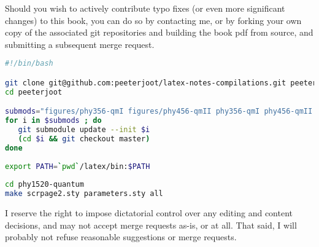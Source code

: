 %
%

Should you wish to actively contribute typo fixes (or even more significant changes) to this book, you can do so by contacting me, or by forking your own copy of the associated git repositories and building the book pdf from source, and submitting a subsequent merge request.

\begin{lstlisting}[language=bash]
#!/bin/bash

git clone git@github.com:peeterjoot/latex-notes-compilations.git peeterjoot
cd peeterjoot

submods="figures/phy356-qmI figures/phy456-qmII phy356-qmI phy456-qmII figures/phy1520-quantum phy1520-quantum julia mathematica latex"
for i in $submods ; do
   git submodule update --init $i
   (cd $i && git checkout master)
done
 
export PATH=`pwd`/latex/bin:$PATH
 
cd phy1520-quantum
make scrpage2.sty parameters.sty all
\end{lstlisting}

I reserve the right to impose dictatorial control over any editing and content decisions, and may not accept merge requests as-is, or at all. That said, I will probably not refuse reasonable suggestions or merge requests.
